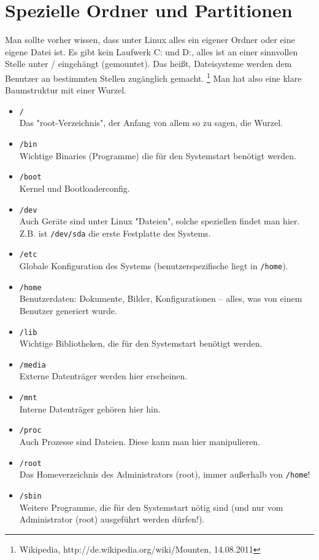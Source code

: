 \documentclass[a4paper,10pt]{article}
\begin{document}
\section{Spezielle Ordner und Partitionen}
Man sollte vorher wissen, dass unter Linux alles ein eigener Ordner oder 
eine eigene Datei ist. Es gibt kein Laufwerk C: und D:, alles ist 
an einer sinnvollen Stelle unter / eingehängt (gemountet). Das heißt, 
Dateisysteme werden dem Benutzer an bestimmten Stellen zugänglich gemacht.
\footnote{Wikipedia, http://de.wikipedia.org/wiki/Mounten, 14.08.2011}
Man hat also eine klare Baumstruktur mit einer Wurzel.
\begin{itemize}
\item \texttt{/} \\ Das "root-Verzeichnis", der Anfang von allem so zu sagen, die Wurzel.
\item \texttt{/bin} \\ Wichtige Binaries (Programme) die für den Systemstart benötigt werden.
\item \texttt{/boot} \\ Kernel und Bootloaderconfig.
\item \texttt{/dev} \\ Auch Geräte sind unter Linux "Dateien", solche 
speziellen findet man hier. Z.B. ist \texttt{/dev/sda} die erste Festplatte des Systems.
\item \texttt{/etc} \\ Globale Konfiguration des Systems (benutzerspezifische liegt in \texttt{/home}).
\item \texttt{/home} \\ Benutzerdaten: Dokumente, Bilder, Konfigurationen -- alles, was von einem Benutzer generiert wurde.
\item \texttt{/lib} \\ Wichtige Bibliotheken, die für den Systemstart benötigt werden.
\item \texttt{/media} \\ Externe Datenträger werden hier erscheinen.
\item \texttt{/mnt} \\ Interne Datenträger gehören hier hin.
\item \texttt{/proc} \\ Auch Prozesse sind Dateien. Diese kann man hier manipulieren.
\item \texttt{/root} \\ Das Homeverzeichnis des Administrators (root), immer außerhalb von \texttt{/home}!
\item \texttt{/sbin} \\ Weitere Programme, die für den Systemstart nötig sind (und nur vom Administrator (root) ausgeführt werden dürfen!).

\end{itemize}
\end{document}
